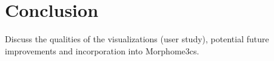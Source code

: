 \chapter*{Conclusion}

Discuss the qualities of the visualizations (user study), potential future improvements and incorporation into Morphome3cs.